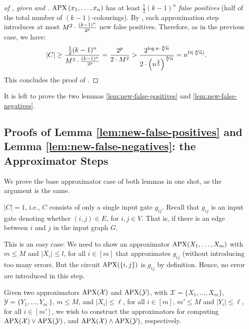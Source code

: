 \begin{proof}[of , given   and ]
\medskip 

\noindent{} $\operatorname{\mathrm{APX}}\left(x_1, \ldots, x_n\right)$ has at least $\frac{1}{2}(k-1)^n$ \emph{false positives} (half of the total number of  $(k-1)$-colourings).
By ,
each approximation step introduces at most $ M^2\cdot \frac{(k-1)^n}{2^p}$
 new false positives. Therefore,  as in the previous case, we have:
$$
|C| \geq \frac{\frac{1}{2}(k-1)^n}{M^2\cdot \frac{(k-1)^n}{2^p}}
= \frac{2^p}{2 \cdot M^2}
> \frac{2^{\log n\cdot \sqrt[8]{n}}}
    {2 \cdot \left(
        n^{\frac{2}{3}}
                \right)^{
                    \sqrt[8]{n}}
                    }
= n^{\Omega(\sqrt[8]{n})}.
$$
This concludes the proof of .
\end{proof}
It is left to prove the two lemmas  \ref{lem:new-false-positives} and \ref{lem:new-false-negatives}. 





\subsection{Proofs of Lemma \ref{lem:new-false-positives} and Lemma \ref{lem:new-false-negatives}: the Approximator Steps}

We prove the base approximator case of  both lemmas in one shot, as the argument is the same.  

 $|C|=1$, i.e., $C$ consists of only a single input gate $g_{ij}$. Recall that $g_{i j}$ is an input gate denoting whether $(i, j) \in E$, for $i, j \in V$.
That is, if there is an edge between $i$ and $j$ in the input graph $G$.

This is an easy case: We need to show an approximator $\operatorname{\mathrm{APX}}(X_1, \ldots, X_m)$ with $m \leq M$ and $\left|X_i\right| \leq l$, for all $i \in[m]$ that approximates $g_{i j}$ (without introducing too many errors.
But the circuit $\mathrm{APX}(\{i, j\})$ is $g_{i j}$ by definition. Hence, no error are introduced in this step.





Given two approximators
$\operatorname{\mathrm{APX}}(\mathcal X)$ and 
$\operatorname{\mathrm{APX}}(\mathcal Y) 
$, with $\mathcal{X}=\{X_1, \ldots, X_m\}$, 
$\mathcal{Y}=\{Y_1, \ldots, Y_{m^{\prime}}\}$, $m\le M$, and $\left|X_i\right| \leq \ell $, for all $i\in[m]$, $m'\le M $ and $\left|Y_i\right| \leq \ell$, for all $i\in[m']$, we wish to construct the  approximators  for computing $\mathrm{APX}(\mathcal{X}) \vee \mathrm{APX}(\mathcal{Y})$, and $\operatorname{\mathrm{APX}}(\mathcal X) \wedge 
\operatorname{\mathrm{APX}}(\mathcal Y)$, respectively.

